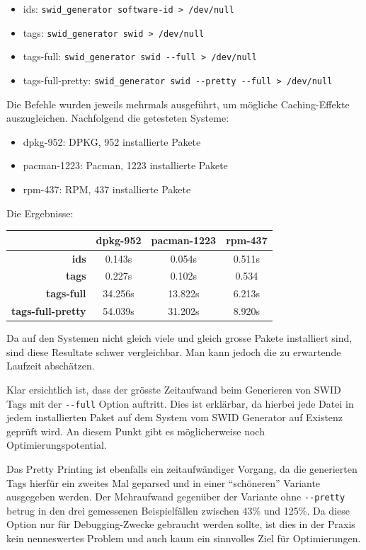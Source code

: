 \begin{itemize}
	\item ids: \texttt{swid\_generator software-id > /dev/null}
	\item tags: \texttt{swid\_generator swid > /dev/null}
	\item tags-full: \texttt{swid\_generator swid -{}-full > /dev/null}
	\item tags-full-pretty: \texttt{swid\_generator swid -{}-pretty -{}-full > /dev/null}
\end{itemize}

Die Befehle wurden jeweils mehrmals ausgeführt, um mögliche Caching-Effekte
auszugleichen. Nachfolgend die getesteten Systeme:

\begin{itemize}
	\item dpkg-952: DPKG, 952 installierte Pakete
	\item pacman-1223: Pacman, 1223 installierte Pakete
	\item rpm-437: RPM, 437 installierte Pakete
\end{itemize}

Die Ergebnisse:

\begin{tabularx}{\textwidth}{rCCC}
	& \textbf{dpkg-952} & \textbf{pacman-1223} & \textbf{rpm-437} \\
	\hline
	\textbf{ids} & 0.143s & 0.054s & 0.511s \\
	\hline
	\textbf{tags} & 0.227s & 0.102s & 0.534\\
	\hline
	\textbf{tags-full} & 34.256s & 13.822s & 6.213s \\
	\hline
	\textbf{tags-full-pretty} & 54.039s & 31.202s & 8.920s \\
	\hline
\end{tabularx}

\vspace{1.5em}

Da auf den Systemen nicht gleich viele und gleich grosse Pakete installiert
sind, sind diese Resultate schwer vergleichbar. Man kann jedoch die zu
erwartende Laufzeit abschätzen.

Klar ersichtlich ist, dass der grösste Zeitaufwand beim Generieren von SWID Tags
mit der \texttt{-{}-full} Option auftritt. Dies ist erklärbar, da hierbei jede
Datei in jedem installierten Paket auf dem System vom SWID Generator auf
Existenz geprüft wird. An diesem Punkt gibt es möglicherweise noch
Optimierungspotential.

Das Pretty Printing ist ebenfalls ein zeitaufwändiger Vorgang, da die
generierten Tags hierfür ein zweites Mal geparsed und in einer
\enquote{schöneren} Variante ausgegeben werden. Der Mehraufwand gegenüber
der Variante ohne \texttt{-{}-pretty} betrug in den drei gemessenen
Beispielfällen zwischen 43\% und 125\%. Da diese Option nur für Debugging-Zwecke
gebraucht werden sollte, ist dies in der Praxis kein nenneswertes Problem und
auch kaum ein sinnvolles Ziel für Optimierungen.


